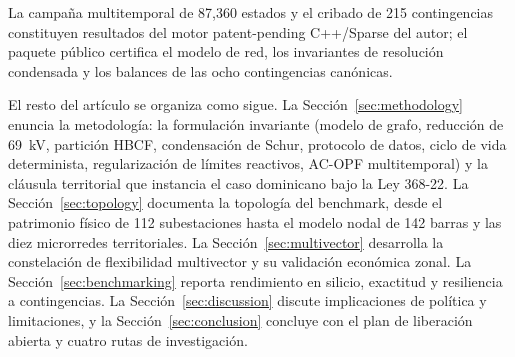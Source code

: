 La campaña multitemporal de 87,360 estados y el cribado de 215 contingencias constituyen resultados del motor patent-pending C++/Sparse del autor; el paquete público certifica el modelo de red, los invariantes de resolución condensada y los balances de las ocho contingencias canónicas.

El resto del artículo se organiza como sigue. La Sección~\ref{sec:methodology} enuncia la metodología: la formulación invariante (modelo de grafo, reducción de 69~kV, partición HBCF, condensación de Schur, protocolo de datos, ciclo de vida determinista, regularización de límites reactivos, AC-OPF multitemporal) y la cláusula territorial que instancia el caso dominicano bajo la Ley 368-22. La Sección~\ref{sec:topology} documenta la topología del benchmark, desde el patrimonio físico de 112 subestaciones hasta el modelo nodal de 142 barras y las diez microrredes territoriales. La Sección~\ref{sec:multivector} desarrolla la constelación de flexibilidad multivector y su validación económica zonal. La Sección~\ref{sec:benchmarking} reporta rendimiento en silicio, exactitud y resiliencia a contingencias. La Sección~\ref{sec:discussion} discute implicaciones de política y limitaciones, y la Sección~\ref{sec:conclusion} concluye con el plan de liberación abierta y cuatro rutas de investigación.
